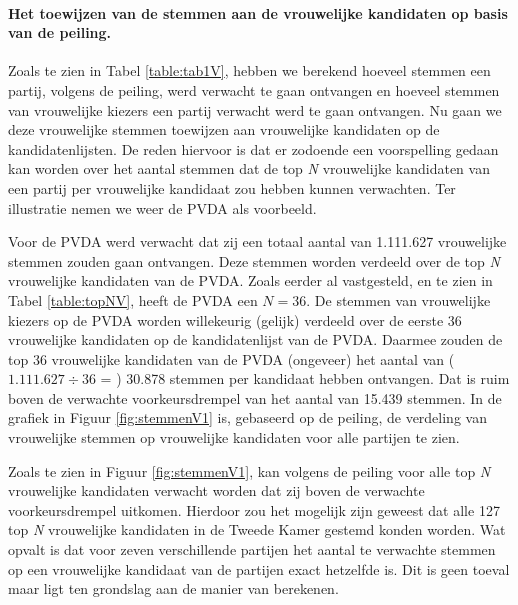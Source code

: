 \paragraph{Het toewijzen van de stemmen aan de vrouwelijke kandidaten op basis van de peiling.}
Zoals te zien in Tabel \ref{table:tab1V}, hebben we berekend hoeveel stemmen een partij, volgens de peiling, werd verwacht te gaan ontvangen en hoeveel stemmen van vrouwelijke kiezers een partij verwacht werd te gaan ontvangen. Nu gaan we deze vrouwelijke stemmen toewijzen aan vrouwelijke kandidaten op de kandidatenlijsten. De reden hiervoor is dat er zodoende een voorspelling gedaan kan worden over het aantal stemmen dat de top \textit{N} vrouwelijke kandidaten van een partij per vrouwelijke kandidaat zou hebben kunnen verwachten. Ter illustratie nemen we weer de PVDA als voorbeeld.

Voor de PVDA werd verwacht dat zij een totaal aantal van 1.111.627 vrouwelijke stemmen zouden gaan ontvangen. Deze stemmen worden verdeeld over de top \textit{N} vrouwelijke kandidaten van de PVDA. Zoals eerder al vastgesteld, en te zien in Tabel \ref{table:topNV}, heeft de PVDA een $N=36$. De stemmen van vrouwelijke kiezers op de PVDA worden willekeurig (gelijk) verdeeld over de eerste 36 vrouwelijke kandidaten op de kandidatenlijst van de PVDA. Daarmee zouden de top 36 vrouwelijke kandidaten van de PVDA (ongeveer) het aantal van ($1.111.627\div36$ = ) 30.878 stemmen per kandidaat hebben ontvangen. Dat is ruim boven de verwachte voorkeursdrempel van het aantal van 15.439 stemmen. In de grafiek in Figuur \ref{fig:stemmenV1} is, gebaseerd op de peiling, de verdeling van vrouwelijke stemmen op vrouwelijke kandidaten voor alle partijen te zien.

Zoals te zien in Figuur \ref{fig:stemmenV1}, kan volgens de peiling voor alle top \textit{N} vrouwelijke kandidaten verwacht worden dat zij boven de verwachte voorkeursdrempel uitkomen. Hierdoor zou het mogelijk zijn geweest dat alle 127 top \textit{N} vrouwelijke kandidaten in de Tweede Kamer gestemd konden worden. Wat opvalt is dat voor zeven verschillende partijen het aantal te verwachte stemmen op een vrouwelijke kandidaat van de partijen exact hetzelfde is. Dit is geen toeval maar ligt ten grondslag aan de manier van berekenen.

